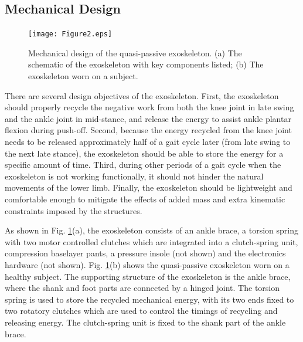 \documentclass[twocolumn,cleanfoot,10pt]{asme2ej}
\begin{document}
\subsection{Mechanical Design}

\begin{figure}[b]
	\centering
	\texttt{[image: Figure2.eps]}
	\caption{Mechanical design of the quasi-passive exoskeleton.
	(a) The schematic of the exoskeleton with key components listed; (b) The exoskeleton worn on a subject.}
	\label{fig:model}   
\end{figure}

There are several design objectives of the exoskeleton.
First, the exoskeleton should properly recycle the negative work from both the knee joint in late swing and the ankle joint in mid-stance, and release the energy to assist ankle plantar flexion during push-off.
Second, because the energy recycled from the knee joint needs to be released approximately half of a gait cycle later (from late swing to the next late stance), the exoskeleton should be able to store the energy for a specific amount of time.
Third, during other periods of a gait cycle when the exoskeleton is not working functionally, it should not hinder the natural movements of the lower limb.
Finally, the exoskeleton should be lightweight and comfortable enough to mitigate the effects of added mass and extra kinematic constraints imposed by the structures.

As shown in Fig. \ref{fig:model}(a), the exoskeleton consists of an ankle brace, a torsion spring with two motor controlled clutches which are integrated into a clutch-spring unit, compression baselayer pants, a pressure insole (not shown) and the electronics hardware (not shown).
Fig. \ref{fig:model}(b) shows the quasi-passive exoskeleton worn on a healthy subject.
The supporting structure of the exoskeleton is the ankle brace, where the shank and foot parts are connected by a hinged joint.
The torsion spring is used to store the recycled mechanical energy, with its two ends fixed to two rotatory clutches which are used to control the timings of recycling and releasing energy.
The clutch-spring unit is fixed to the shank part of the ankle brace.

\end{document}
